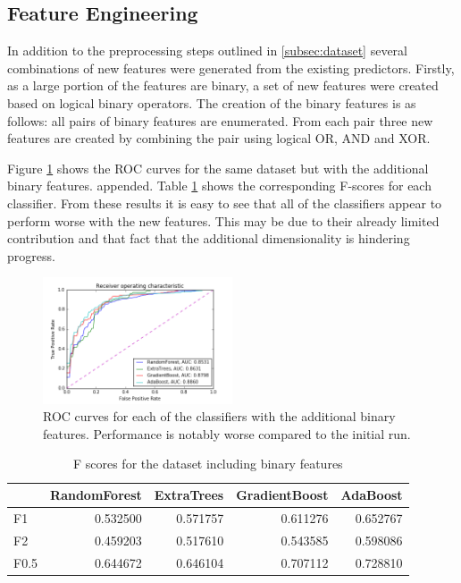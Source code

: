 \documentclass[journal]{IEEEtran}
\begin{document}
\subsection{Feature Engineering}
In addition to the preprocessing steps outlined in \ref{subsec:dataset} several combinations of new features were generated from the existing predictors. Firstly, as a large portion of the features are binary, a set of new features were created based on logical binary operators. The creation of the binary features is as follows: all pairs of binary features are enumerated. From each pair three new features are created by combining the pair using logical OR, AND and XOR.

Figure \ref{fig:roc-binary-features} shows the ROC curves for the same dataset but with the additional binary features. appended. Table \ref{table:f-scores-binary} shows the corresponding F-scores for each classifier. From these results it is easy to see that all of the classifiers appear to perform worse with the new features. This may be due to their already limited contribution and that fact that the additional dimensionality is hindering progress.

\begin{figure}[!t]
\centering
\includegraphics[width=0.5\textwidth]{../src/img/roc_binary_features.png}
\caption{ROC curves for each of the classifiers with the additional binary features. Performance is notably worse compared to the initial run.}
\label{fig:roc-binary-features}
\end{figure}


\begin{table}
\caption{F scores for the dataset including binary features}
\begin{tabular}{lrrrr}
{} &  RandomForest &  ExtraTrees &  GradientBoost &  AdaBoost \\
\hline
F1   &      0.532500 &    0.571757 &       0.611276 &  0.652767 \\
F2   &      0.459203 &    0.517610 &       0.543585 &  0.598086 \\
F0.5 &      0.644672 &    0.646104 &       0.707112 &  0.728810 \\
\end{tabular}
\label{table:f-scores-binary}	
\end{table}
\end{document}
